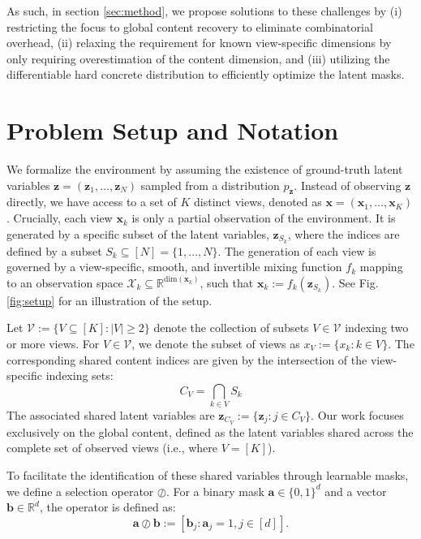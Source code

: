 \documentclass[a4paper,12pt]{article}
\begin{document}
As such, in section \ref{sec:method}, we propose solutions to these challenges by (i) restricting the focus to global content recovery to eliminate combinatorial overhead, (ii) relaxing the requirement for known view-specific dimensions by only requiring overestimation of the content dimension, and (iii) utilizing the differentiable hard concrete distribution \cite{louizos2018learningsparseneuralnetworks} to efficiently optimize the latent masks.

\section{Problem Setup and Notation} \label{sec:setup}
We formalize the environment by assuming the existence of ground-truth latent variables $\mathbf{z} = (\mathbf{z}_1, \dots, \mathbf{z}_N)$ sampled from a distribution $p_\mathbf{z}$. Instead of observing $\mathbf{z}$ directly, we have access to a set of $K$ distinct views, denoted as $\mathbf{x} = (\mathbf{x}_1, \dots, \mathbf{x}_K)$. Crucially, each view $\mathbf{x}_k$ is only a partial observation of the environment. It is generated by a specific subset of the latent variables, $\mathbf{z}_{S_k}$, where the indices are defined by a subset $S_k \subseteq [N]=\{1, \dots, N\}$. The generation of each view is governed by a view-specific, smooth, and invertible mixing function $f_k$ mapping to an observation space $\mathcal{X}_k \subseteq \mathbb{R}^{\text{dim}(\mathbf{x}_k)}$, such that $\mathbf{x}_k := f_k(\mathbf{z}_{S_k})$. See Fig. \ref{fig:setup} for an illustration of the setup.

Let $\mathcal{V} := \{V \subseteq [K] : |V| \ge 2\}$ denote the collection of subsets $V \in \mathcal{V}$ indexing two or more views.
For $V \in \mathcal{V}$, we denote the subset of views as $x_V := \{x_k : k \in V\}$. The corresponding shared content indices are given by the intersection of the view-specific indexing sets:
\begin{equation*}
  C_V = \bigcap_{k \in V} S_k
\end{equation*}
The associated shared latent variables are $\mathbf{z}_{C_V} := \{\mathbf{z}_j : j \in C_V\}$.
Our work focuses exclusively on the global content, defined as the latent variables shared across the complete set of observed views (i.e., where $V = [K]$).

To facilitate the identification of these shared variables through learnable masks, we define a selection operator $\oslash$. For a binary mask $\mathbf{a} \in \{0, 1\}^d$ and a vector $\mathbf{b} \in \mathbb{R}^d$, the operator is defined as:
\begin{equation*}
  \mathbf{a} \oslash \mathbf{b} := [\mathbf{b}_j : \mathbf{a}_j = 1, j \in [d]].
\end{equation*}
\end{document}
